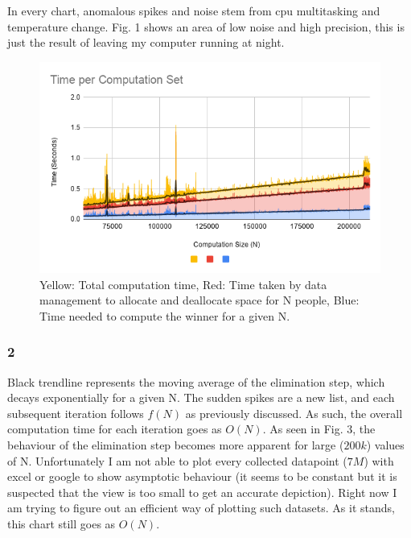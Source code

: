 \documentclass[journal]{IEEEtran}
\begin{document}
In every chart, anomalous spikes and noise stem from cpu multitasking and temperature change. Fig. 1 shows an 
area of low noise and high precision, this is just the result of leaving my computer running at night.

\begin{figure}[h!]
	\includegraphics[scale = 0.5]{TC1.png}
	\caption{Yellow: Total computation time, Red: Time taken by data management to allocate and deallocate 
            space for N people, Blue: Time needed to compute the winner for a given N.}
\end{figure}


\subsubsection{2}

Black trendline represents the moving average of the elimination step, which decays exponentially for a given N. The sudden spikes are a new 
list, and each subsequent iteration follows $f(N)$ as previously discussed. As such, the overall computation time 
for each iteration goes as $O(N)$. As seen in Fig. 3, the behaviour of the elimination step becomes more apparent for large ($200k$) values of N. 
Unfortunately I am not able to plot every collected datapoint ($7M$) with excel or google to 
show asymptotic behaviour (it seems to be constant but it is suspected that the view is 
too small to get an accurate depiction). Right now I am trying to figure out an efficient 
way of plotting such datasets. As it stands, this chart still goes as $O(N)$. 
\end{document}
